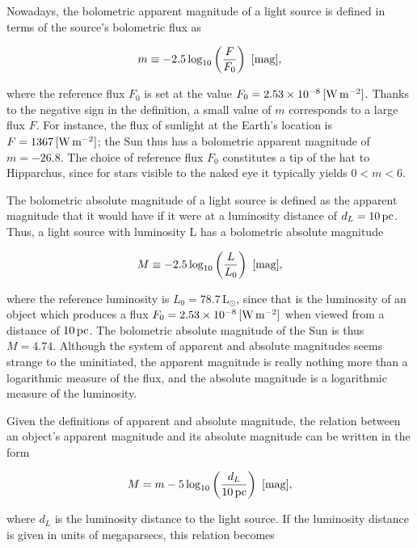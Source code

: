 \documentclass[a4paper,11pt]{article}
\begin{document}
{\noindent}Nowadays, the bolometric apparent magnitude of a light source is defined in terms of the source’s bolometric flux as

\begin{align*}
    m \equiv -2.5\log_{10}\left(\frac{F}{F_0}\right) ~ [{\rm mag}],
\end{align*}

{\noindent}where the reference flux $F_0$ is set at the value $F_0 = 2.53\times10^{-8}\,[{\rm W\,m^{-2}}]$. Thanks to the negative sign in the definition, a small value of $m$ corresponds to a large flux $F$. For instance, the flux of sunlight at the Earth’s location is $F = 1367\,[{\rm W\,m^{-2}}]$; the Sun thus has a bolometric apparent magnitude of $m = −26.8$. The choice of reference flux $F_0$ constitutes a tip of the hat to Hipparchus, since for stars visible to the naked eye it typically yields $0 < m < 6$.

{\noindent}The bolometric absolute magnitude of a light source is defined as the apparent magnitude that it would have if it were at a luminosity distance of $d_L = 10\,{\rm pc}$. Thus, a light source with luminosity L has a bolometric absolute magnitude

\begin{align*}
    M \equiv -2.5\log_{10}\left(\frac{L}{L_0}\right) ~ [{\rm mag}],
\end{align*}

{\noindent}where the reference luminosity is $L_0=78.7\,\mathrm{L}_\odot$, since that is the luminosity of an object which produces a flux $F_0 = 2.53\times10^{-8}\,[{\rm W\,m^{-2}}]$ when viewed from a distance of $10\,{\rm pc}$. The bolometric absolute magnitude of the Sun is thus $M = 4.74$. Although the system of apparent and absolute magnitudes seems strange to the uninitiated, the apparent magnitude is really nothing more than a logarithmic measure of the flux, and the absolute magnitude is a logarithmic measure of the luminosity.

{\noindent}Given the definitions of apparent and absolute magnitude, the relation between an object’s apparent magnitude and its absolute magnitude can be written in the form

\begin{align*}
    M = m -5\log_{10}\left(\frac{d_L}{10\,{\rm pc}}\right) ~ [{\rm mag}],
\end{align*}

{\noindent}where $d_L$ is the luminosity distance to the light source. If the luminosity distance is given in units of megaparsecs, this relation becomes
\end{document}
